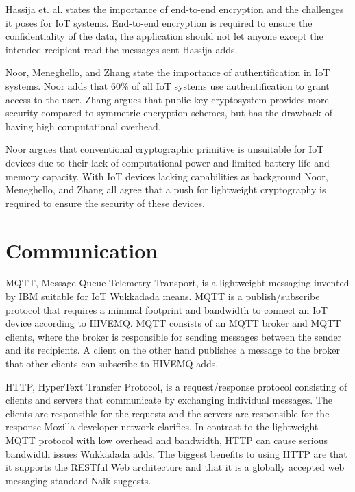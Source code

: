 Hassija et. al. states the importance of end-to-end encryption and the challenges it poses for IoT systems.\cite{Hassija2019}
End-to-end encryption is required to ensure the confidentiality of the data, the application should not let anyone except the intended recipient read the messages sent Hassija adds.\cite{Hassija2019}

Noor, Meneghello, and Zhang state the importance of authentification in IoT systems.\cite{Noor2019,Meneghello2019,Zhang2014} 
Noor adds that 60\% of all IoT systems use authentification to grant access to the user.\cite{Noor2019}  
Zhang argues that public key cryptosystem provides more security compared to symmetric encryption schemes, but has the drawback of having high computational overhead.\cite{Zhang2014} 

Noor argues that conventional cryptographic primitive is unsuitable for IoT devices due to their lack of computational power and limited battery life and memory capacity.\cite{Noor2019}
With IoT devices lacking capabilities as background Noor, Meneghello, and Zhang all agree that a push for lightweight cryptography is required to ensure the security of these devices.\cite {Noor2019,Meneghello2019,Zhang2014} 

\section{Communication} 
MQTT, Message Queue Telemetry Transport, is a lightweight messaging invented by IBM suitable for IoT Wukkadada means.\cite{Wukkadada2018} 
MQTT is a publish/subscribe protocol that requires a minimal footprint and bandwidth to connect an IoT device according to HIVEMQ.\cite{MQTT2021}
MQTT consists of an MQTT broker and MQTT clients, where the broker is responsible for sending messages between the sender and its recipients.\cite{Wukkadada2018}
A client on the other hand publishes a message to the broker that other clients can subscribe to HIVEMQ adds.\cite{MQTT2021}

HTTP, HyperText Transfer Protocol, is a request/response protocol consisting of clients and servers that communicate by exchanging individual messages. 
The clients are responsible for the requests and the servers are responsible for the response Mozilla developer network clarifies. \cite{HTTP2021} 
In contrast to the lightweight MQTT protocol with low overhead and bandwidth, HTTP can cause serious bandwidth issues Wukkadada adds. \cite{Wukkadada2018}
The biggest benefits to using HTTP are that it supports the RESTful Web architecture and that it is a globally accepted web messaging standard Naik suggests. \cite{Naik2017} 

